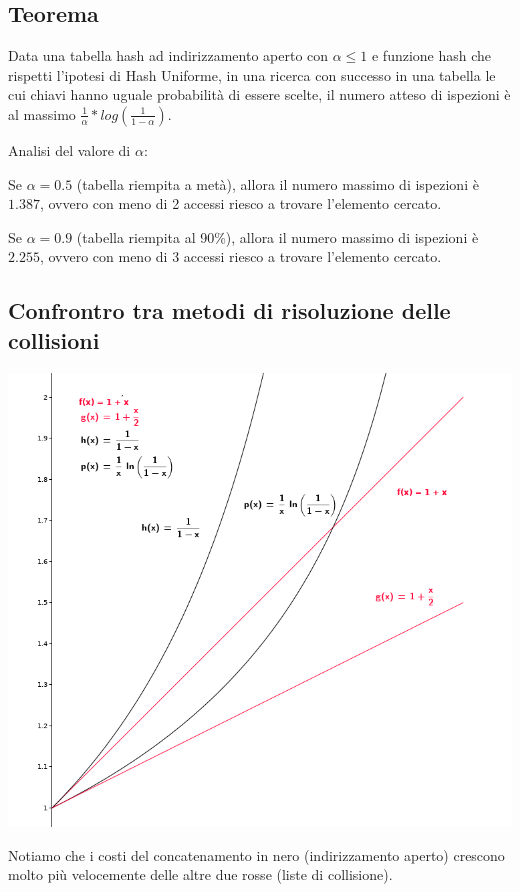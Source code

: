 \documentclass{article}
\begin{document}
\subsection{Teorema}

{Data una tabella hash ad indirizzamento aperto con $\alpha \leq 1$ e funzione hash che rispetti l'ipotesi di Hash Uniforme, in una ricerca con successo in una tabella le cui chiavi hanno uguale probabilità di essere scelte, il numero atteso di ispezioni è al massimo $\frac{1}{\alpha} * log(\frac{1}{1-\alpha})$.}

{Analisi del valore di $\alpha$:}

{Se $\alpha=0.5$ (tabella riempita a metà), allora il numero massimo di ispezioni è $1.387$, ovvero con meno di 2 accessi riesco a trovare l'elemento cercato.}

{Se $\alpha=0.9$ (tabella riempita al 90\%), allora il numero massimo di ispezioni è $2.255$, ovvero con meno di 3 accessi riesco a trovare l'elemento cercato.}

\subsection{Confrontro tra metodi di risoluzione delle collisioni}

{\includegraphics{images/image541.png}}

{Notiamo che i costi del concatenamento in nero (indirizzamento aperto) crescono molto più velocemente delle altre due rosse (liste di collisione).}
\end{document}
